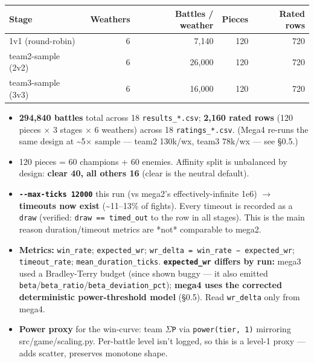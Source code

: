 \documentclass[10pt]{article}
\begin{document}
\medskip
\begin{tabularx}{\linewidth}{Lrrrr}
\toprule
\textbf{Stage} & \textbf{Weathers} & \textbf{Battles / weather} & \textbf{Pieces} & \textbf{Rated rows} \\
\midrule
1v1 (round-robin) & 6 & 7,140 & 120 & 720 \\
team2-sample (2v2) & 6 & 26,000 & 120 & 720 \\
team3-sample (3v3) & 6 & 16,000 & 120 & 720 \\
\bottomrule
\end{tabularx}
\medskip

\begin{itemize}
\item \textbf{294,840 battles} total across 18 \texttt{results\_\allowbreak{}*.\allowbreak{}csv}; \textbf{2,160 rated rows} (120 pieces $\times$ 3 stages $\times$ 6 weathers) across 18 \texttt{ratings\_\allowbreak{}*.\allowbreak{}csv}. (Mega4 re-runs the same design at \textasciitilde{}5$\times$ sample --- team2 130k/wx, team3 78k/wx --- see \S{}0.5.)
\item 120 pieces = 60 champions + 60 enemies. Affinity split is unbalanced by design: \textbf{clear 40, all others 16} (clear is the neutral default).
\item \textbf{\texttt{-\allowbreak{}-\allowbreak{}max-\allowbreak{}ticks 12000}} this run (vs mega2's effectively-infinite 1e6) $\rightarrow$ \textbf{timeouts now exist} (\textasciitilde{}11--13\% of fights). Every timeout is recorded as a \texttt{draw} (verified: \texttt{draw == timed\_\allowbreak{}out} to the row in all stages). This is the main reason duration/timeout metrics are *not* comparable to mega2.
\item \textbf{Metrics:} \texttt{win\_\allowbreak{}rate}; \texttt{expected\_\allowbreak{}wr}; \texttt{wr\_\allowbreak{}delta = win\_\allowbreak{}rate − expected\_\allowbreak{}wr}; \texttt{timeout\_\allowbreak{}rate}; \texttt{mean\_\allowbreak{}duration\_\allowbreak{}ticks}. \textbf{\texttt{expected\_\allowbreak{}wr} differs by run:} mega3 used a Bradley-Terry budget (since shown buggy --- it also emitted \texttt{beta}/\texttt{beta\_\allowbreak{}ratio}/\texttt{beta\_\allowbreak{}deviation\_\allowbreak{}pct}); \textbf{mega4 uses the corrected deterministic power-threshold model} (\S{}0.5). Read \texttt{wr\_\allowbreak{}delta} only from mega4.
\item \textbf{Power proxy} for the win-curve: team \texttt{$\Sigma$P} via \texttt{power(\allowbreak{}tier,\allowbreak{} 1)\allowbreak{}} mirroring src/game/scaling.py. Per-battle level isn't logged, so this is a level-1 proxy --- adds scatter, preserves monotone shape.
\end{itemize}
\end{document}
